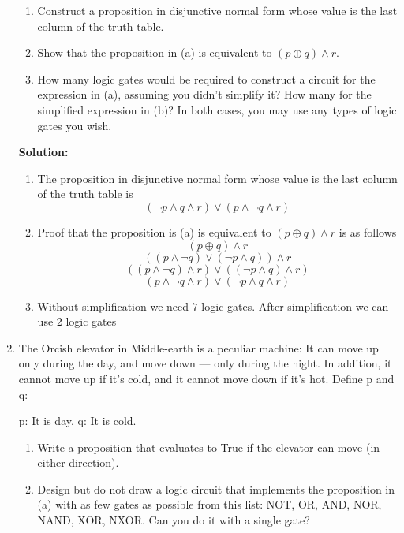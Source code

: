 \documentclass[12pt]{article}
\begin{document}
\begin{enumerate}
\begin{table}[h]
        \end{table}


        \begin{enumerate}
            \item Construct a proposition in disjunctive normal form whose value is the last column of the truth table. 
            \item Show that the proposition in (a) is equivalent to $(p \oplus q)\land r$.
            \item How many logic gates would be required to construct a circuit for the expression in (a), assuming you didn't simplify it? How many for the simplified expression in (b)?  In both cases, you may use any types of logic gates you wish.
        \end{enumerate}

        \textbf{Solution: }
        \begin{enumerate}
            \item The proposition in disjunctive normal form whose value is the last column of the truth table is
                \[(\neg p \wedge q \wedge r) \vee (p \wedge \neg q \wedge r)\]
            \item Proof that the proposition is (a) is equivalent to $(p \oplus q)\land r$ is as follows
                \[ (p \oplus q)\land r \]
                \[ ((p \wedge \neg q) \vee (\neg p \wedge q)) \land r \]
                \[ ((p \wedge \neg q) \land r) \vee ((\neg p \wedge q) \land r) \]
                \[ (p \wedge \neg q \land r) \vee (\neg p \wedge q \land r) \]
            \item Without simplification we need $7$ logic gates. After simplification we can use $2$ logic gates
        \end{enumerate}

    \item The Orcish elevator in Middle-earth is a peculiar machine: It can move up only during the day, and move down --- only during the night. In addition, it cannot move up if it's cold, and it cannot move down if it's hot. Define p and q:

        \subitem p: It is day.
        \subitem q: It is cold.

        \begin{enumerate}
            \item Write a proposition that evaluates to True if the elevator can move (in either direction).  
            \item Design but do not draw a logic circuit that implements the proposition in (a) with as few gates as possible from this list: NOT, OR, AND, NOR, NAND, XOR, NXOR. Can you do it with a single gate?
        \end{enumerate}


\end{enumerate}
\end{document}
